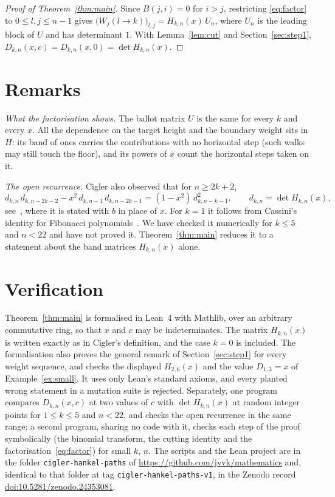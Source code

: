 \documentclass[11pt]{amsart}
\theoremstyle{definition}
\begin{document}
\begin{proof}[Proof of Theorem~\ref{thm:main}]
Since $B(j,i)=0$ for $i>j$, restricting \eqref{eq:factor} to $0\le l,j\le n-1$ gives
$\big(W_j(l\to k)\big)_{l,j}=H_{k,n}(x)\,U_n$, where $U_n$ is the leading block of $U$ and has determinant $1$.
With Lemma~\ref{lem:cut} and Section~\ref{sec:step1},
$D_{k,n}(x,c)=D_{k,n}(x,0)=\det H_{k,n}(x)$.
\end{proof}

\section{Remarks}\label{sec:remarks}

\emph{What the factorisation shows.} The ballot matrix $U$ is the same for every $k$ and every $x$. All the dependence
on the target height and the boundary weight sits in $H$: its band of ones carries the contributions with no
horizontal step (such walks may still touch the floor), and its powers of $x$ count the horizontal steps taken on it.

\emph{The open recurrence.} Cigler also observed that for $n\ge2k+2$,
\[
d_{k,n}\,d_{k,n-2k-2}-x^2\,d_{k,n-1}\,d_{k,n-2k-1}=(1-x^2)\,d_{k,n-k-1}^2,\qquad d_{k,n}=\det H_{k,n}(x),
\]
see~\cite[equation~(18)]{C23}, where it is stated with $b$ in place of $x$. For $k=1$ it follows from Cassini's identity
for Fibonacci polynomials~\cite{C23}. We have checked it numerically for $k\le5$ and $n<22$ and have not proved it.
Theorem~\ref{thm:main} reduces it to a statement about the band matrices $H_{k,n}(x)$ alone.

\section{Verification}\label{sec:verify}

Theorem~\ref{thm:main} is formalised in Lean~4 with Mathlib, over an arbitrary commutative ring, so that $x$ and $c$ may
be indeterminates. The matrix $H_{k,n}(x)$ is written exactly as in Cigler's definition, and the case $k=0$ is
included. The formalisation also proves the general remark of Section~\ref{sec:step1} for every weight sequence, and
checks the displayed $H_{2,6}(x)$ and the value $D_{1,3}=x$ of Example~\ref{ex:small}. It uses only Lean's standard
axioms, and every planted wrong statement in a mutation suite is rejected. Separately, one program compares
$D_{k,n}(x,c)$ at two values of $c$ with $\det H_{k,n}(x)$ at random integer points for $1\le k\le5$ and $n<22$, and
checks the open recurrence in the same range; a second program, sharing no code with it, checks each step of the proof
symbolically (the binomial transform, the cutting identity and the factorisation~\eqref{eq:factor}) for small $k$, $n$. The scripts and the
Lean project are in the folder \texttt{cigler-hankel-paths} of \url{https://github.com/jvvk/mathematics} and, identical
to that folder at tag \texttt{cigler-hankel-paths-v1}, in the Zenodo record \href{https://doi.org/10.5281/zenodo.24353081}{doi:10.5281/zenodo.24353081}.
\end{document}
